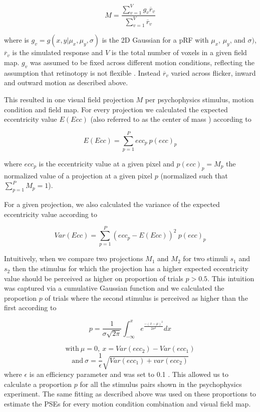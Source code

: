 \begin{equation}
M = \frac{\sum_{v=1}^{V} g_v \overline{r}_v}{\sum_{v=1}^{V} \overline{r}_v}
\end{equation}

where is $g_v = g(x, y|\mu_x,\mu_y,\sigma)$ is the 2D Gaussian for a pRF with $\mu_x$, $\mu_y$, and $\sigma)$, $\overline{r}_v$ is the simulated response and $V$ is the total number of voxels in a given field map. $g_v$ was assumed to be fixed across different motion conditions, reflecting the assumption that retinotopy is not flexible \parencite{Liu2006}. Instead $\overline{r}_v$ varied across flicker, inward and outward motion as described above.

This resulted in one visual field projection $M$ per psychophysics stimulus, motion condition and field map. For every projection we calculated the expected eccentricity value $E(Ecc)$ (also referred to as the center of mass \parencite{Liu2006}) according to

\begin{equation}
E(Ecc) = \sum_{p=1}^{P} ecc_p\ p(ecc)_p
\end{equation}

where $ecc_p$ is the eccentricity value at a given pixel and $p(ecc)_p = M_p$ the normalized value of a projection at a given pixel $p$ (normalized such that $\sum_{p=1}^{P} M_p = 1$).

For a given projection, we also calculated the variance of the expected eccentricity value according to

\begin{equation}
Var(Ecc) = \sum_{p=1}^{P} (ecc_p - E(Ecc))^2\ p(ecc)_p
\end{equation}

Intuitively, when we compare two projections $M_1$ and $M_2$ for two stimuli $s_1$ and $s_2$ then the stimulus for which the projection has a higher expected eccentricity value should be perceived as higher on proportion of trials $p > 0.5$. This intuition was captured via a cumulative Gaussian function \parencite{VanHumbeeck2016} and we calculated the proportion $p$ of trials where the second stimulus is perceived as higher than the first according to

\begin{equation}
p = \frac{1}{\sigma \sqrt{2 \pi}} \int_{-\infty}^{x} e^{\frac{-(x - \mu)^2}{2 \sigma^2}}dx
\end{equation}

$$\textrm{with}\ \mu = 0,\ x = Var(ecc_2) - Var(ecc_1)$$
$$\textrm{and}\ \sigma = \frac{1}{\epsilon}\sqrt{Var(ecc_1) + var(ecc_2)}$$
where $\epsilon$ is an efficiency parameter and was set to 0.1 \parencite{VanHumbeeck2016}. This allowed us to calculate a proportion $p$ for all the stimulus pairs shown in the psychophysics experiment. The same fitting as described above was used on these proportions to estimate the PSEs for every motion condition combination and visual field map.

